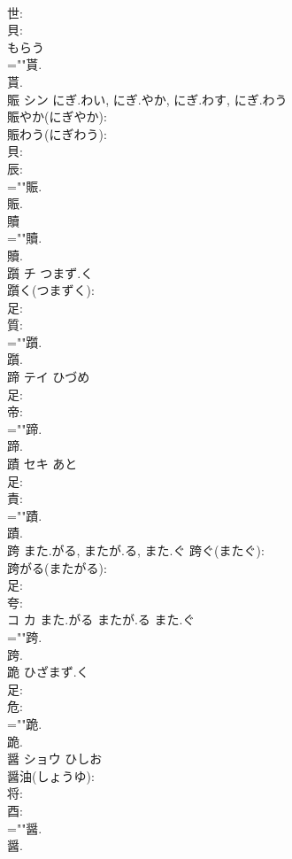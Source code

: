 \documentclass[8pt]{extreport}
\begin{document}
\begin{CJK}{UTF8}{min}
\\	世: 
\\	貝: 
\\	もらう 
\\	=""貰.
\\	貰.
\\	賑	シン	にぎ.わい, にぎ.やか, にぎ.わす, にぎ.わう		
\\	賑やか(にぎやか): 
\\	賑わう(にぎわう): 
\\	貝: 
\\	辰: 
\\	=""賑.
\\	賑.
\\	贖						
\\	=""贖.
\\	贖.
\\	躓	チ	つまず.く		
\\	躓く(つまずく): 
\\	足: 
\\	質: 
\\	=""躓.
\\	躓.
\\	蹄	テイ	ひづめ		
\\	足: 
\\	帝: 
\\	=""蹄.
\\	蹄.
\\	蹟	セキ	あと		
\\	足: 
\\	責: 
\\	=""蹟.
\\	蹟.
\\	跨		また.がる, またが.る, また.ぐ			跨ぐ(またぐ): 
\\	跨がる(またがる): 
\\	足: 
\\	夸: 
\\	コ カ また.がる またが.る また.ぐ 
\\	=""跨.
\\	跨.
\\	跪		ひざまず.く				
\\	足: 
\\	危: 
\\	=""跪.
\\	跪.
\\	醤	ショウ	ひしお		
\\	醤油(しょうゆ): 
\\	将: 
\\	酉: 
\\	=""醤.
\\	醤.

\end{CJK}
\end{document}
